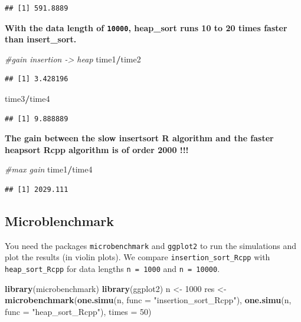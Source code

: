 \documentclass[
]{article}
\newenvironment{Shaded}{\begin{snugshade}}{\end{snugshade}}
\newcommand{\AttributeTok}[1]{\textcolor[rgb]{0.13,0.29,0.53}{#1}}
\newcommand{\CommentTok}[1]{\textcolor[rgb]{0.56,0.35,0.01}{\textit{#1}}}
\newcommand{\DecValTok}[1]{\textcolor[rgb]{0.00,0.00,0.81}{#1}}
\newcommand{\FunctionTok}[1]{\textcolor[rgb]{0.13,0.29,0.53}{\textbf{#1}}}
\newcommand{\NormalTok}[1]{#1}
\newcommand{\OtherTok}[1]{\textcolor[rgb]{0.56,0.35,0.01}{#1}}
\newcommand{\SpecialCharTok}[1]{\textcolor[rgb]{0.81,0.36,0.00}{\textbf{#1}}}
\newcommand{\StringTok}[1]{\textcolor[rgb]{0.31,0.60,0.02}{#1}}
\begin{document}
\begin{verbatim}
## [1] 591.8889
\end{verbatim}

\textbf{With the data length of \texttt{10000}, heap\_sort runs 10 to 20
times faster than insert\_sort.}

\begin{Shaded}
\begin{Highlighting}[]
\CommentTok{\#gain insertion {-}\textgreater{} heap}
\NormalTok{time1}\SpecialCharTok{/}\NormalTok{time2}
\end{Highlighting}
\end{Shaded}

\begin{verbatim}
## [1] 3.428196
\end{verbatim}

\begin{Shaded}
\begin{Highlighting}[]
\NormalTok{time3}\SpecialCharTok{/}\NormalTok{time4}
\end{Highlighting}
\end{Shaded}

\begin{verbatim}
## [1] 9.888889
\end{verbatim}

\textbf{The gain between the slow insertsort R algorithm and the faster
heapsort Rcpp algorithm is of order 2000 !!!}

\begin{Shaded}
\begin{Highlighting}[]
\CommentTok{\#max gain}
\NormalTok{time1}\SpecialCharTok{/}\NormalTok{time4}
\end{Highlighting}
\end{Shaded}

\begin{verbatim}
## [1] 2029.111
\end{verbatim}

\subsection{Microblenchmark}\label{microblenchmark}

You need the packages \texttt{microbenchmark} and \texttt{ggplot2} to
run the simulations and plot the results (in violin plots). We compare
\texttt{insertion\_sort\_Rcpp} with \texttt{heap\_sort\_Rcpp} for data
lengths \texttt{n\ =\ 1000} and \texttt{n\ =\ 10000}.

\begin{Shaded}
\begin{Highlighting}[]
\FunctionTok{library}\NormalTok{(microbenchmark)}
\FunctionTok{library}\NormalTok{(ggplot2)}
\NormalTok{n }\OtherTok{\textless{}{-}} \DecValTok{1000}
\NormalTok{res }\OtherTok{\textless{}{-}} \FunctionTok{microbenchmark}\NormalTok{(}\FunctionTok{one.simu}\NormalTok{(n, }\AttributeTok{func =} \StringTok{"insertion\_sort\_Rcpp"}\NormalTok{), }\FunctionTok{one.simu}\NormalTok{(n, }\AttributeTok{func =} \StringTok{"heap\_sort\_Rcpp"}\NormalTok{), }\AttributeTok{times =} \DecValTok{50}\NormalTok{)}
\end{Highlighting}
\end{Shaded}
\end{document}
